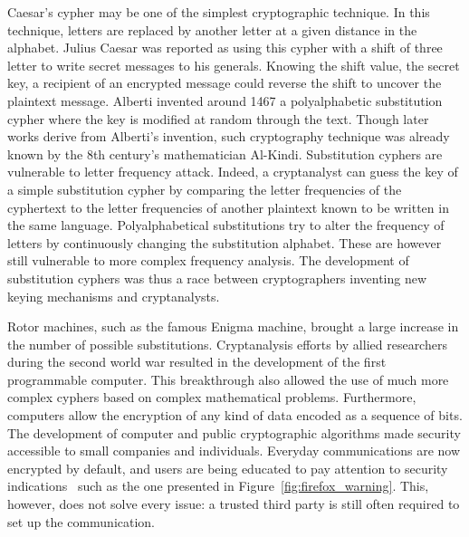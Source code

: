 Caesar's cypher may be one of the simplest cryptographic technique.
In this technique, letters are replaced by another letter at a given distance in the alphabet.
Julius Caesar was reported as using this cypher with a shift of three letter to write secret messages to his generals.
Knowing the shift value, \ie the secret key, a recipient of an encrypted message could reverse the shift to uncover the plaintext message.
Alberti invented around 1467 a polyalphabetic substitution cypher where the key is modified at random through the text.
Though later works derive from Alberti's invention, such cryptography technique was already known by the 8th century's mathematician Al-Kindi.
Substitution cyphers are vulnerable to letter frequency attack.
Indeed, a cryptanalyst can guess the key of a simple substitution cypher by comparing the letter frequencies of the cyphertext to the letter frequencies of another plaintext known to be written in the same language.
Polyalphabetical substitutions try to alter the frequency of letters by continuously changing the substitution alphabet.
These are however still vulnerable to more complex frequency analysis.
The development of substitution cyphers was thus a race between cryptographers inventing new keying mechanisms and cryptanalysts.

Rotor machines, such as the famous Enigma machine, brought a large increase in the number of possible substitutions. 
Cryptanalysis efforts by allied researchers during the second world war resulted in the development of the first programmable computer.
This breakthrough also allowed the use of much more complex cyphers based on complex mathematical problems.
Furthermore, computers allow the encryption of any kind of data encoded as a sequence of bits.
The development of computer and public cryptographic algorithms made security accessible to small companies and individuals. 
Everyday communications are now encrypted by default, and users are being educated to pay attention to security indications~\cite{mozillasecurityblog2017communicating} such as the one presented in Figure~\ref{fig:firefox_warning}.
This, however, does not solve every issue: a trusted third party is still often required to set up the communication.

